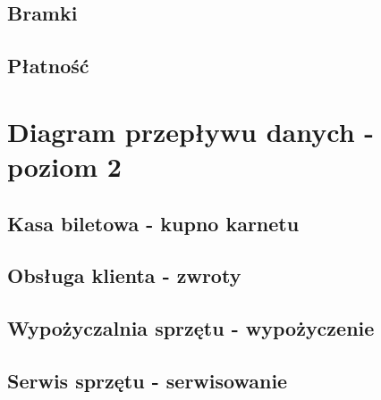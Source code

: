 \begin{landscape}
	\newpage
	\subsection{Bramki}
	\begin{figure}
		
	\end{figure}
    
    \newpage
	\subsection{Płatność}
	\begin{figure}
		
	\end{figure}
		
	\newpage
	\section{Diagram przepływu danych - poziom 2}
	\subsection{Kasa biletowa - kupno karnetu}
	\begin{figure}
		
	\end{figure}
		
	\newpage
	\subsection{Obsługa klienta - zwroty}
	\begin{figure}
		
	\end{figure}
		
	\newpage
	\subsection{Wypożyczalnia sprzętu - wypożyczenie}
	\begin{figure}
		
	\end{figure}
		
	\newpage
	\subsection{Serwis sprzętu - serwisowanie}
	\begin{figure}
		
	\end{figure}
		

\end{landscape}
